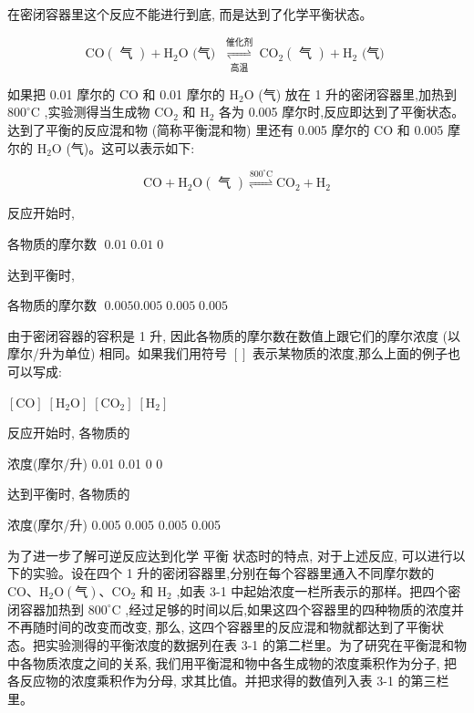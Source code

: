 \documentclass[10pt]{article}
\begin{document}
在密闭容器里这个反应不能进行到底, 而是达到了化学平衡状态。

\[
\mathrm{{CO}}\left( \text{ 气 }\right) + {\mathrm{H}}_{2}\mathrm{O}\text{ (气) }\underset{\text{ 高温 }}{\overset{\text{ 催化剂 }}{ \rightleftharpoons }}{\mathrm{{CO}}}_{2}\left( \text{ 气 }\right) + {\mathrm{H}}_{2}\text{ (气) }
\]

如果把 0.01 摩尔的 \(\mathrm{{CO}}\) 和 0.01 摩尔的 \({\mathrm{H}}_{2}\mathrm{O}\) (气) 放在 1 升的密闭容器里,加热到 \({800}^{ \circ }\mathrm{C}\) ,实验测得当生成物 \({\mathrm{{CO}}}_{2}\) 和 \({\mathrm{H}}_{2}\) 各为 0.005 摩尔时,反应即达到了平衡状态。达到了平衡的反应混和物 (简称平衡混和物) 里还有 0.005 摩尔的 \(\mathrm{{CO}}\) 和 0.005 摩尔的 \({\mathrm{H}}_{2}\mathrm{O}\) (气)。这可以表示如下:

\[
\mathrm{{CO}} + {\mathrm{H}}_{2}\mathrm{O}\left( \text{ 气 }\right) \mathop{\rightleftharpoons }\limits^{{{800}^{ \circ }\mathrm{C}}}{\mathrm{{CO}}}_{2} + {\mathrm{H}}_{2}
\]

反应开始时,

各物质的摩尔数 \(\;{0.01}\;{0.01}\;0\)

达到平衡时,

各物质的摩尔数 \(\;{0.0050.005}\;{0.005}\;{0.005}\)

由于密闭容器的容积是 1 升, 因此各物质的摩尔数在数值上跟它们的摩尔浓度 (以摩尔/升为单位) 相同。如果我们用符号 \(\left\lbrack \right\rbrack\) 表示某物质的浓度,那么上面的例子也可以写成:

\(\left\lbrack \mathrm{{CO}}\right\rbrack \;\left\lbrack {{\mathrm{H}}_{2}\mathrm{O}}\right\rbrack \;\left\lbrack {\mathrm{{CO}}}_{2}\right\rbrack \;\left\lbrack {\mathrm{H}}_{2}\right\rbrack\)

反应开始时, 各物质的

浓度(摩尔/升) 0.01 0.01 0 0

达到平衡时, 各物质的

浓度(摩尔/升) 0.005 0.005 0.005 0.005

为了进一步了解可逆反应达到化学 平衡 状态时的特点, 对于上述反应, 可以进行以下的实验。设在四个 1 升的密闭容器里,分别在每个容器里通入不同摩尔数的 \(\mathrm{{CO}}\text{、}{\mathrm{H}}_{2}\mathrm{O}\left( \text{气}\right) \text{、}{\mathrm{{CO}}}_{2}\) 和 \({\mathrm{H}}_{2}\) ,如表 3-1 中起始浓度一栏所表示的那样。把四个密闭容器加热到 \({800}^{ \circ }\mathrm{C}\) ,经过足够的时间以后,如果这四个容器里的四种物质的浓度并不再随时间的改变而改变, 那么, 这四个容器里的反应混和物就都达到了平衡状态。把实验测得的平衡浓度的数据列在表 3-1 的第二栏里。为了研究在平衡混和物中各物质浓度之间的关系, 我们用平衡混和物中各生成物的浓度乘积作为分子, 把各反应物的浓度乘积作为分母, 求其比值。并把求得的数值列入表 3-1 的第三栏里。
\end{document}
